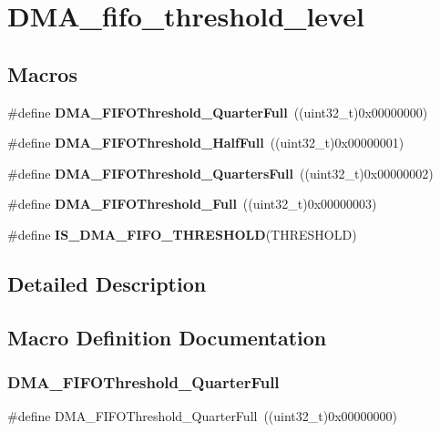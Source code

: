 \section{D\+M\+A\+\_\+fifo\+\_\+threshold\+\_\+level}
\label{group__DMA__fifo__threshold__level}
\subsection*{Macros}
\begin{DoxyCompactItemize}
\item 
\#define \textbf{ D\+M\+A\+\_\+\+F\+I\+F\+O\+Threshold\+\_\+Quarter\+Full}~((uint32\+\_\+t)0x00000000)
\item 
\#define \textbf{ D\+M\+A\+\_\+\+F\+I\+F\+O\+Threshold\+\_\+\+Half\+Full}~((uint32\+\_\+t)0x00000001)
\item 
\#define \textbf{ D\+M\+A\+\_\+\+F\+I\+F\+O\+Threshold\+\_\+Quarters\+Full}~((uint32\+\_\+t)0x00000002)
\item 
\#define \textbf{ D\+M\+A\+\_\+\+F\+I\+F\+O\+Threshold\+\_\+\+Full}~((uint32\+\_\+t)0x00000003)
\item 
\#define \textbf{ I\+S\+\_\+\+D\+M\+A\+\_\+\+F\+I\+F\+O\+\_\+\+T\+H\+R\+E\+S\+H\+O\+LD}(T\+H\+R\+E\+S\+H\+O\+LD)
\end{DoxyCompactItemize}


\subsection{Detailed Description}


\subsection{Macro Definition Documentation}
\mbox{\label{group__DMA__fifo__threshold__level_gacc98384bbba43a9c4f70b448518acfe4}} 
\subsubsection{D\+M\+A\+\_\+\+F\+I\+F\+O\+Threshold\+\_\+Quarter\+Full}
{\footnotesize\ttfamily \#define D\+M\+A\+\_\+\+F\+I\+F\+O\+Threshold\+\_\+Quarter\+Full~((uint32\+\_\+t)0x00000000)}



